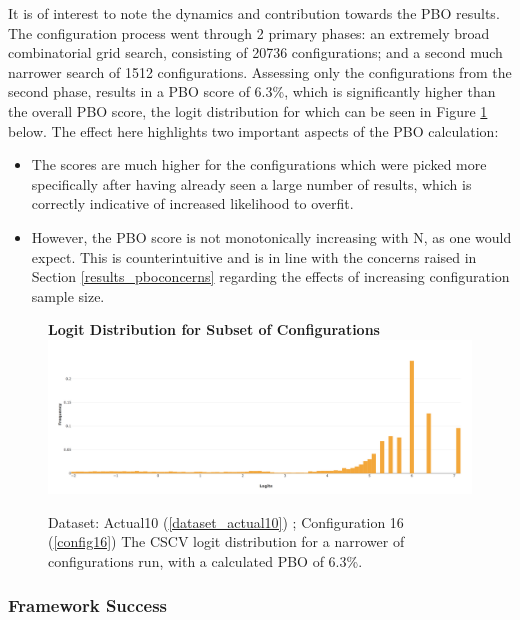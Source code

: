 \documentclass[a4paper,11pt,oneside]{article}
\theoremstyle{plain}
\theoremstyle{definition}
\begin{document}
	
	It is of interest to note the dynamics and contribution towards the PBO results. The configuration process went through 2 primary phases: an extremely broad combinatorial grid search, consisting of 20736 configurations; and a second much narrower search of 1512 configurations. Assessing only the configurations from the second phase, results in a PBO score of 6.3\%, which is significantly higher than the overall PBO score, the logit distribution for which can be seen in Figure \ref{figure-results_logits_subset} below. The effect here highlights two important aspects of the PBO calculation:
	\begin{itemize}
		\item[1] The scores are much higher for the configurations which were picked more specifically after having already seen a large number of results, which is correctly indicative of increased likelihood to overfit.
		\item[2] However, the PBO score is not monotonically increasing with N, as one would expect. This is counterintuitive and is in line with the concerns raised in Section \ref{results_pboconcerns} regarding the effects of increasing configuration sample size.
	\end{itemize}
	
	\begin{figure}[H]
		\centering 
		\textbf{Logit Distribution for Subset of Configurations}
		\includegraphics[scale=0.25]{images/results/pbo/subset_dist.png} 
		\caption[Logit Distribution for Subset of Configurations]{Dataset: Actual10 (\ref{dataset_actual10}) ; Configuration 16 (\ref{config16})
			\newline The CSCV logit distribution for a narrower of configurations run, with a calculated PBO of 6.3\%.}
		\label{figure-results_logits_subset}
	\end{figure}
	
	
	\subsubsection{Framework Success}
	
\end{document}
